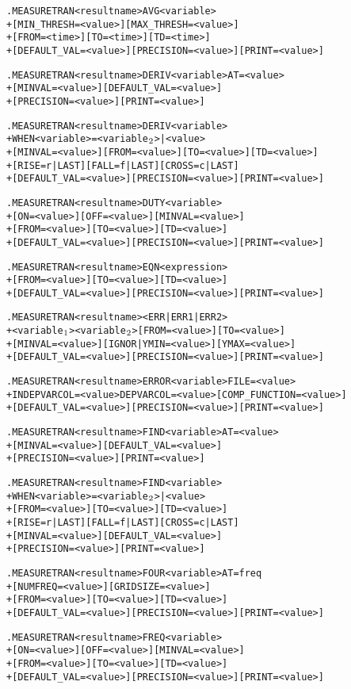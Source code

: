 \begin{Command}
\format
\begin{alltt}
.MEASURE TRAN <result name> AVG <variable>
+ [MIN_THRESH=<value>] [MAX_THRESH=<value>]
+ [FROM=<time>] [TO=<time>] [TD=<time>]
+ [DEFAULT_VAL=<value>] [PRECISION=<value>] [PRINT=<value>]

.MEASURE TRAN <result name> DERIV <variable> AT=<value>
+ [MINVAL=<value>] [DEFAULT_VAL=<value>] 
+ [PRECISION=<value>] [PRINT=<value>]

.MEASURE TRAN <result name> DERIV <variable>
+ WHEN <variable>=<variable\(\sb{2}\)>|<value>
+ [MINVAL=<value>] [FROM=<value>] [TO=<value>] [TD=<value>] 
+ [RISE=r|LAST] [FALL=f|LAST] [CROSS=c|LAST]
+ [DEFAULT_VAL=<value>] [PRECISION=<value>] [PRINT=<value>]

.MEASURE TRAN <result name> DUTY <variable>
+ [ON=<value>] [OFF=<value>] [MINVAL=<value>]
+ [FROM=<value>] [TO=<value>] [TD=<value>]
+ [DEFAULT_VAL=<value>] [PRECISION=<value>] [PRINT=<value>]

.MEASURE TRAN <result name> EQN <expression> 
+ [FROM=<value>] [TO=<value>] [TD=<value>]
+ [DEFAULT_VAL=<value>] [PRECISION=<value>] [PRINT=<value>]

.MEASURE TRAN <result name> <ERR|ERR1|ERR2>
+ <variable\(\sb{1}\)> <variable\(\sb{2}\)> [FROM=<value>] [TO=<value>]
+ [MINVAL=<value>] [IGNOR|YMIN=<value>] [YMAX=<value>]
+ [DEFAULT_VAL=<value>] [PRECISION=<value>] [PRINT=<value>]

.MEASURE TRAN <result name> ERROR <variable> FILE=<value>
+ INDEPVARCOL=<value> DEPVARCOL=<value> [COMP_FUNCTION=<value>]
+ [DEFAULT_VAL=<value>] [PRECISION=<value>] [PRINT=<value>]

.MEASURE TRAN <result name> FIND <variable> AT=<value>
+ [MINVAL=<value>] [DEFAULT_VAL=<value>]
+ [PRECISION=<value>] [PRINT=<value>]

.MEASURE TRAN <result name> FIND <variable>
+ WHEN <variable>=<variable\(\sb{2}\)>|<value>
+ [FROM=<value>] [TO=<value>] [TD=<value>] 
+ [RISE=r|LAST] [FALL=f|LAST] [CROSS=c|LAST]
+ [MINVAL=<value>] [DEFAULT_VAL=<value>] 
+ [PRECISION=<value>] [PRINT=<value>]

.MEASURE TRAN <result name> FOUR <variable> AT=freq
+ [NUMFREQ=<value>] [GRIDSIZE=<value>]
+ [FROM=<value>] [TO=<value>] [TD=<value>] 
+ [DEFAULT_VAL=<value>] [PRECISION=<value>] [PRINT=<value>]

.MEASURE TRAN <result name> FREQ <variable>
+ [ON=<value>] [OFF=<value>] [MINVAL=<value>]
+ [FROM=<value>] [TO=<value>] [TD=<value>] 
+ [DEFAULT_VAL=<value>] [PRECISION=<value>] [PRINT=<value>]


\end{alltt}
\end{Command}
